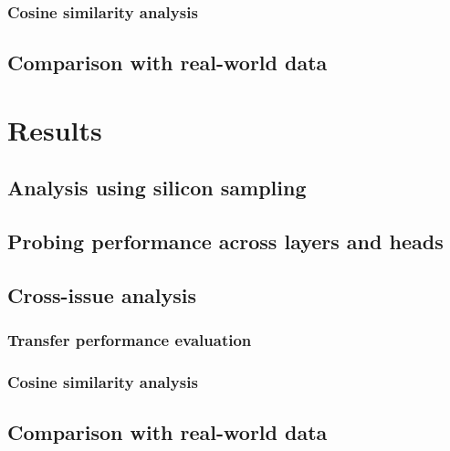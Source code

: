 \documentclass[10pt,letterpaper]{article}
\begin{document}
\subsubsection*{Cosine similarity analysis}
\label{sec:cosine}


\subsection*{Comparison with real-world data}
\label{sec:realworld}


\section*{Results}

\subsection*{Analysis using silicon sampling}
\label{sec:baseline_results}


\subsection*{Probing performance across layers and heads}
\label{sec:layer_analysis}


\subsection*{Cross-issue analysis}
\label{sec:cross_theme_results}

\subsubsection*{Transfer performance evaluation}
\label{sec:transfer_results}

\subsubsection*{Cosine similarity analysis}
\label{sec:cosine_results}


\subsection*{Comparison with real-world data}
\label{sec:realworld_results}
\end{document}
